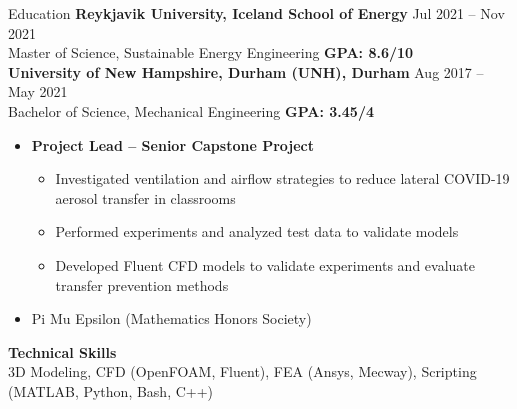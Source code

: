 \documentclass{resume}
\begin{document}
\begin{rSection}{Education}
    {\textbf{Reykjavik University, Iceland School of Energy}} \hfill {Jul 2021 -- Nov 2021}
    \\ {Master of Science, Sustainable Energy Engineering} \hfill {\textbf{GPA: 8.6/10}}
    \\ {\textbf{University of New Hampshire, Durham (UNH), Durham}} \hfill {Aug 2017 -- May 2021}
    \\ {Bachelor of Science, Mechanical Engineering} \hfill {\textbf{GPA: 3.45/4}}
    \vspace{-0.5em}
    \begin{itemize}[label={\tiny\raisebox{1ex}{\textbullet}}, noitemsep]
        \item {\textbf{Project Lead -- Senior Capstone Project}}
            \begin{itemize}[label={\tiny\raisebox{1ex}{\textbullet}}, noitemsep]
                \item Investigated ventilation and airflow strategies to reduce lateral COVID-19 aerosol transfer in classrooms
                \item Performed experiments and analyzed test data to validate models
                \item Developed Fluent CFD models to validate experiments and evaluate transfer prevention methods
            \end{itemize}
        \item Pi Mu Epsilon (Mathematics Honors Society)
    \end{itemize}{}
    \vspace{-0.4em}
    {\textbf{Technical Skills}}
    \\ 3D Modeling, CFD (OpenFOAM, Fluent), FEA (Ansys, Mecway), Scripting (MATLAB, Python, Bash, C++)
    \vspace{-0.4em}
\end{rSection}
\end{document}
